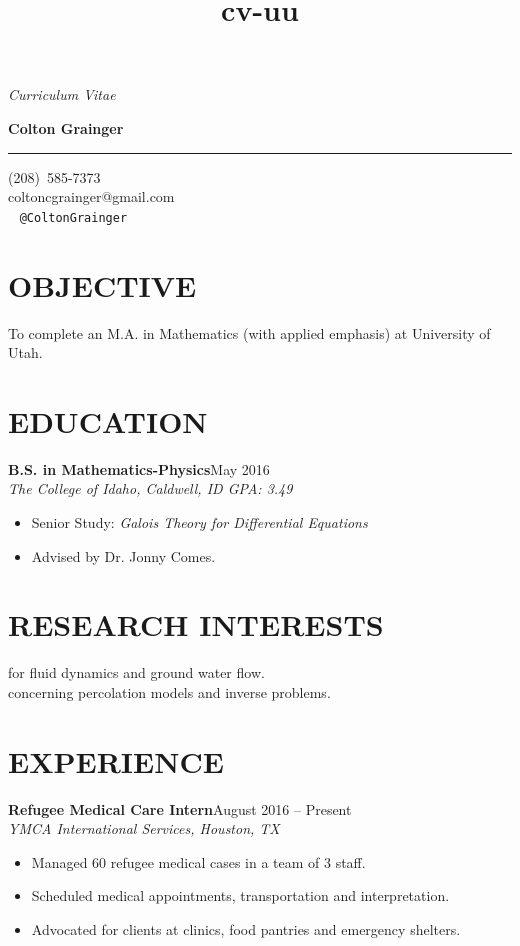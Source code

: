 \documentclass[margin]{res}
\title{cv-uu}
\newcommand\textbox[1]{\parbox{.333\textwidth}{#1} }
\newcommand\job[3]{\textbf{#1}\hfill {#2}\\ \emph{#3} }
\newcommand\degree[3]{\textbf{#1}\hfill {#2}\\ \emph{#3} }
\newenvironment{details}{\begin{itemize}[itemsep=0.6pt,topsep=2.3pt] }{\end{itemize} }
\begin{document}
 

\noindent\textbox{{\it Curriculum Vitae }\hfill } \textbox{\hfill{\large\bf Colton Grainger}\hfill }

\vspace{-20pt}
\rule{\textwidth}{1pt}

\vspace{-20pt}
\begin{flushright} 
(208)~585-7373\\ coltoncgrainger@gmail.com\\ \faTwitter\ \faGithub\hspace{1ex} {\tt @ColtonGrainger} 
\end{flushright}
\vspace{-24pt}

\begin{resume}

\section{OBJECTIVE}
To complete an M.A. in Mathematics (with applied emphasis) at University of Utah.

\section{EDUCATION}
\degree{B.S. in Mathematics-Physics}{May 2016}{The College of Idaho, Caldwell, ID \hfill {\rm GPA: 3.49}}
    \begin{details}
   		\item Senior Study: \emph{Galois Theory for Differential Equations}
        \item Advised by Dr. Jonny Comes.
    \end{details}

\section{RESEARCH INTERESTS}
 for fluid dynamics and ground water flow.\\
 concerning percolation models and inverse problems.

\section{EXPERIENCE}
\job{Refugee Medical Care Intern}{August 2016 -- Present}{YMCA International Services, Houston, TX}
    \begin{details}
	  	\item Managed 60 refugee medical cases in a team of 3 staff.
        \item Scheduled medical appointments, transportation and interpretation.
        \item Advocated for clients at clinics, food pantries and emergency shelters. 
	\end{details}
     

\end{resume}
\end{document}
